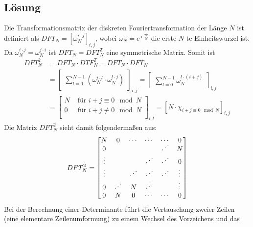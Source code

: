 \subsection*{Lösung}
\begin{flushenum}
	\item Die Transformationsmatrix der diskreten Fouriertransformation der
		Länge $N$ ist definiert als $DFT_N = [ \omega_N^{i \cdot j}
		]_{i,j}$, wobei $\omega_N = e^{\imath \frac{2 \pi}{N}}$ die
		erste $N$-te Einheitswurzel ist. Da $\omega_N^{i \cdot j} =
		\omega_N^{j \cdot i}$ ist $DFT_N = DFT_N^T$ eine symmetrische
		Matrix. Somit ist
	\begin{equation*}
	\begin{split}
	DFT_N^2 & =  DFT_N \cdot DTF_N^T = DFT_N \cdot DFT_N \\
	& =
	\begin{bmatrix}
		\sum_{l = 0}^{N-1} \left(\omega_N^{i \cdot l} \cdot \omega_N^{l \cdot j}\right)
	\end{bmatrix}_{i, j} =
	\begin{bmatrix}
		\sum_{l=0}^{N-1} \omega_N^{l \cdot (i + j)}
	\end{bmatrix}_{i,j} \\
	& =
	\begin{bmatrix}
		N & \text{ für } i + j \equiv 0 \mod N \\
		0 & \text{ für } i + j \not\equiv 0 \mod N \\
	\end{bmatrix}_{i,l} = 
	[ N \cdot \chi_{i + j \equiv 0 \mod N} ]_{i,j}
	\end{split}
	\end{equation*}
	Die Matrix $DFT_N^2$ sieht damit folgendermaßen aus:
	\[ DFT_N^2 = 
	\begin{bmatrix}
		N      & 0      & \cdots & \cdots & \cdots & 0      \\
		0      &        &        &        & \Ddots & N      \\
		\vdots &        &        & \Ddots & \Ddots & 0      \\
		\vdots &        & \Ddots & \Ddots & \Ddots & \vdots \\
		0      & \Ddots & N      & \Ddots &        & \vdots \\
		0      & N      & 0      & \cdots & \cdots & 0      \\
	\end{bmatrix} \]
	Bei der Berechnung einer Determinante führt die Vertauschung zweier Zeilen
	(eine elementare Zeilenumformung) zu einem Wechsel des Vorzeichens und das

\end{flushenum}
